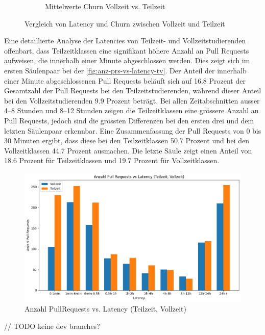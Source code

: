 \begin{figure}[ht]
\begin{subfigure}[b]{0.48\textwidth}
        \caption{Mittelwerte Churn Vollzeit vs. Teilzeit}
        \label{fig:mittelwert-churn-t-v}
    \end{subfigure}
    \caption{Vergleich von Latency und Churn zwischen Vollzeit und Teilzeit}
    \label{fig:vergleich-latency-churn}
\end{figure}

Eine detaillierte Analyse der Latencies von Teilzeit- und Vollzeitstudierenden offenbart, dass Teilzeitklassen eine signifikant höhere Anzahl an Pull Requests aufweisen, die innerhalb einer Minute abgeschlossen werden. Dies zeigt sich im ersten Säulenpaar bei der \autoref{fig:anz-prs-vs-latency-tv}. Der Anteil der innerhalb einer Minute abgeschlossenen Pull Requests beläuft sich auf 16.8 Prozent der Gesamtzahl der Pull Requests bei den Teilzeitstudierenden, während dieser Anteil bei den Vollzeitstudierenden 9.9 Prozent beträgt. Bei allen Zeitabschnitten ausser 4–8 Stunden und 8–12 Stunden zeigen die Teilzeitklassen eine grössere Anzahl an Pull Requests, jedoch sind die grössten Differenzen bei den ersten drei und dem letzten Säulenpaar erkennbar. Eine Zusammenfassung der Pull Requests von 0 bis 30 Minuten ergibt, dass diese bei den Teilzeitklassen 50.7 Prozent und bei den Vollzeitklassen 44.7 Prozent ausmachen. Die letzte Säule zeigt einen Anteil von 18.6 Prozent für Teilzeitklassen und 19.7 Prozent für Vollzeitklassen. 
\begin{figure}[htbp]
    \includegraphics[width=\textwidth]{Figures/anz-prs-vs-latency-tv.png}
    \caption{Anzahl PullRequests vs. Latency (Teilzeit, Vollzeit)}
    \label{fig:anz-prs-vs-latency-tv}
\end{figure}

// TODO keine dev branches?
\newpage
